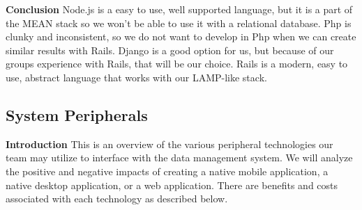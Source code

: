 \documentclass[draftclsnofoot,onecolumn,letterpaper,10pt]{IEEEtran}
\begin{document}
		\textbf{Conclusion}
			Node.js is a easy to use, well supported language, but it is a part of the MEAN stack so we won’t be able to use it with a relational database.
			Php is clunky and inconsistent, so we do not want to develop in Php when we can create similar results with Rails.
			Django is a good option for us, but because of our groups experience with Rails, that will be our choice.
			Rails is a modern, easy to use, abstract language that works with our LAMP-like stack.\\


	\subsection{System Peripherals}
		\textbf{Introduction}
				This is an overview of the various peripheral technologies our team may utilize to interface with the data management system.
				We will analyze the positive and negative impacts of creating a native mobile application, a native desktop application, or a web application.
				There are benefits and costs associated with each technology as described below.
\end{document}
